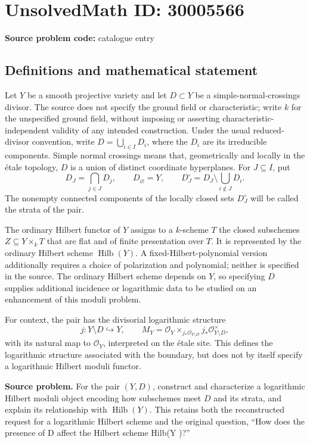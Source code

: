 \documentclass[11pt]{article}
\begin{document}
\section*{UnsolvedMath ID: 30005566}
\textbf{Source problem code:} catalogue entry
\subsection{Definitions and mathematical statement}
Let \(Y\) be a smooth projective variety and let \(D\subset Y\) be a simple-normal-crossings divisor. The source does not specify the ground field or characteristic; write \(k\) for the unspecified ground field, without imposing or asserting characteristic-independent validity of any intended construction. Under the usual reduced-divisor convention, write \(D=\bigcup_{i\in I}D_i\), where the \(D_i\) are its irreducible components. Simple normal crossings means that, geometrically and locally in the étale topology, \(D\) is a union of distinct coordinate hyperplanes. For \(J\subseteq I\), put
\[
D_J=\bigcap_{j\in J}D_j,\qquad D_{\varnothing}=Y,\qquad D_J^{\circ}=D_J\setminus\bigcup_{i\notin J}D_i.
\]
The nonempty connected components of the locally closed sets \(D_J^{\circ}\) will be called the strata of the pair.

The ordinary Hilbert functor of \(Y\) assigns to a \(k\)-scheme \(T\) the closed subschemes \(Z\subseteq Y\times_k T\) that are flat and of finite presentation over \(T\). It is represented by the ordinary Hilbert scheme \(\operatorname{Hilb}(Y)\). A fixed-Hilbert-polynomial version additionally requires a choice of polarization and polynomial; neither is specified in the source. The ordinary Hilbert scheme depends on \(Y\), so specifying \(D\) supplies additional incidence or logarithmic data to be studied on an enhancement of this moduli problem.

For context, the pair has the divisorial logarithmic structure
\[
j:Y\setminus D\hookrightarrow Y,\qquad
M_Y=\mathcal O_Y\mathbin{\times}_{j_*\mathcal O_{Y\setminus D}}j_*\mathcal O_{Y\setminus D}^{\times},
\]
with its natural map to \(\mathcal O_Y\), interpreted on the étale site. This defines the logarithmic structure associated with the boundary, but does not by itself specify a logarithmic Hilbert moduli functor.

\textbf{Source problem.} For the pair \((Y,D)\), construct and characterize a logarithmic Hilbert moduli object encoding how subschemes meet \(D\) and its strata, and explain its relationship with \(\operatorname{Hilb}(Y)\). This retains both the reconstructed request for a logarithmic Hilbert scheme and the original question, ``How does the presence of D affect the Hilbert scheme Hilb(Y )?''
\end{document}
